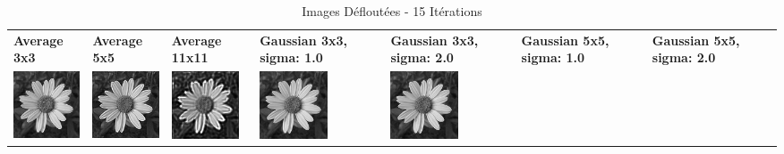 \begin{table}[h!]
    \centering
    \captionsetup{justification=centering}
    \caption*{Images Défloutées - 15 Itérations}
    \begin{tabular}{>{\centering\arraybackslash} m{2cm} >{\centering\arraybackslash} m{2cm} >{\centering\arraybackslash} m{2cm} >{\centering\arraybackslash} m{2cm} >{\centering\arraybackslash} m{2cm} >{\centering\arraybackslash} m{2cm} >{\centering\arraybackslash} m{2cm}}
        \textbf{Average 3x3}                                                                             & \textbf{Average 5x5} & \textbf{Average 11x11} & \textbf{Gaussian 3x3, sigma: 1.0} & \textbf{Gaussian 3x3, sigma: 2.0} & \textbf{Gaussian 5x5, sigma: 1.0} & \textbf{Gaussian 5x5, sigma: 2.0} \\
        \includegraphics[width=2cm]{images/processed/flower/average_3x3/unblurred_15-iter.png}           &
        \includegraphics[width=2cm]{images/processed/flower/average_5x5/unblurred_15-iter.png}           &
        \includegraphics[width=2cm]{images/processed/flower/average_11x11/unblurred_15-iter.png}         &
        \includegraphics[width=2cm]{images/processed/flower/gaussian_3x3_sigma1.0/unblurred_15-iter.png} &
        \includegraphics[width=2cm]{images/processed/flower/gaussian_3x3_sigma2.0/unblurred_15-iter.png} &

\end{tabular}
\end{table}
